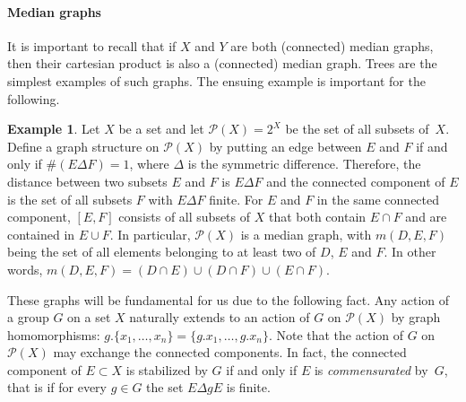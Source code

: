 \documentclass[a4paper]{article}
\theoremstyle{definition}
\newtheorem{exmp}[lem]{Example}
\newcommand*{\powerset}[1]{\mathcal P(#1)}
\newcommand*{\powersetf}[1]{\mathcal P_{\textnormal{f}}(#1)}
\newcommand*{\powersetcof}[1]{\mathcal P_{\textnormal{cof}}(#1)}
\begin{document}
\paragraph{Median graphs}
It is important to recall that if $X$ and $Y$ are both (connected) median graphs, then their cartesian product is also a (connected) median graph. Trees are the simplest examples of such graphs. The ensuing example is important for the following.
%
%
\begin{exmp}\label{Ex:MainMedian}
Let $X$ be a set and let  $\powerset{X}=2^X$ be the set of all subsets of~$X$.
Define a graph structure on $\powerset{X}$ by putting an edge between $E$ and $F$ if and only if $\#(E\Delta F)=1$, where $\Delta$ is the symmetric difference.
Therefore, the distance between two subsets $E$ and $F$ is $E\Delta F$ and
the connected component of $E$ is the set of all subsets $F$ with $E\Delta F$ finite.
For $E$ and $F$ in the same connected component, $[E,F]$ consists of all subsets of $X$ that both contain $E\cap F$ and are contained in $E\cup F$.
In particular, $\powerset{X}$ is a median graph, with $m(D,E,F)$ being the set of all elements belonging to at least two of $D$, $E$ and $F$. In other words, $m(D,E,F)=(D\cap E)\cup(D\cap F)\cup(E\cap F)$.
\end{exmp}
%
%

These graphs will be fundamental for us due to the following fact.
Any action of a group $G$ on a set $X$ naturally extends to an action of $G$ on $\powerset{X}$ by graph homomorphisms: $g.\{x_1,\dots,x_n\}=\{g.x_1,\dots,g.x_n\}$.
Note that the action of $G$ on $\powerset{X}$ may exchange the connected components.
In fact, the connected component of $E\subset X$ is stabilized by $G$ if and only if $E$ is \emph{commensurated} by~$G$, that is if for every $g\in G$ the set $E\Delta gE$ is finite.
\end{document}
